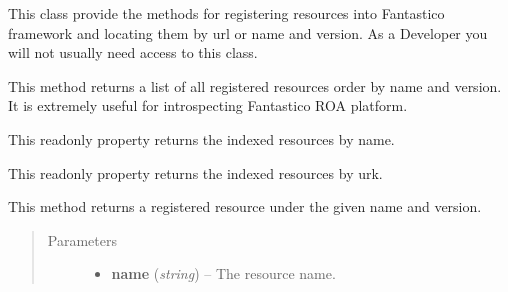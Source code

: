 \documentclass[letterpaper,10pt,english]{sphinxmanual}
\begin{document}

\begin{fulllineitems}
\label{features/roa/technical_summary:fantastico.roa.resources_registry.ResourcesRegistry}
This class provide the methods for registering resources into Fantastico framework and locating them by url or name and
version. As a Developer you will not usually need access to this class.

\begin{fulllineitems}
\label{features/roa/technical_summary:fantastico.roa.resources_registry.ResourcesRegistry.all_resources}
This method returns a list of all registered resources order by name and version. It is extremely useful for
introspecting Fantastico ROA platform.

\end{fulllineitems}


\begin{fulllineitems}
\label{features/roa/technical_summary:fantastico.roa.resources_registry.ResourcesRegistry.available_resources}
This readonly property returns the indexed resources by name.

\end{fulllineitems}


\begin{fulllineitems}
\label{features/roa/technical_summary:fantastico.roa.resources_registry.ResourcesRegistry.available_url_resources}
This readonly property returns the indexed resources by urk.

\end{fulllineitems}


\begin{fulllineitems}
\label{features/roa/technical_summary:fantastico.roa.resources_registry.ResourcesRegistry.find_by_name}
This method returns a registered resource under the given name and version.
\begin{quote}\begin{description}
\item[{Parameters}] \leavevmode\begin{itemize}
\item {} 
\textbf{name} (\emph{string}) -- The resource name.


\end{itemize}
\end{description}
\end{quote}
\end{fulllineitems}
\end{fulllineitems}
\end{document}
